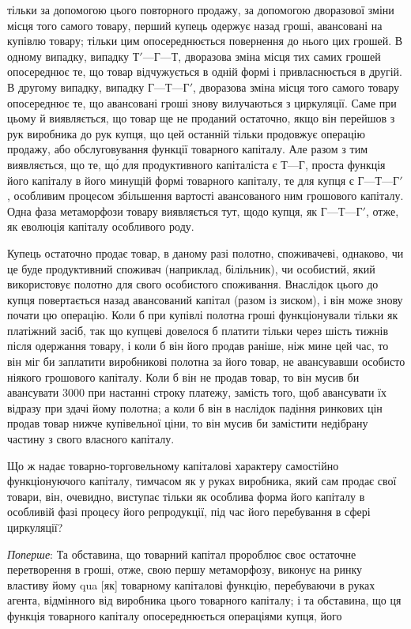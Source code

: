 \parcont{}  %
тільки за допомогою цього повторного продажу, за допомогою
дворазової зміни місця того самого товару, перший купець одержує назад гроші, авансовані на купівлю
товару; тільки цим
опосереднюється повернення до нього цих грошей. В одному
випадку, випадку $Т' — Г — Т$, дворазова зміна місця тих самих грошей опосереднює те, що товар
відчужується в одній
формі і привласнюється в другій. В другому випадку, випадку
$Г — Т — Г'$, дворазова зміна місця того самого товару опосереднює те, що авансовані гроші знову
вилучаються з циркуляції.
Саме при цьому й виявляється, що товар ще не проданий остаточно, якщо він перейшов з рук виробника
до рук купця, що
цей останній тільки продовжує операцію продажу, або обслуговування функції товарного капіталу. Але
разом з тим виявляється, що те, що́ для продуктивного капіталіста є $Т — Г$,
проста функція його капіталу в його минущій формі товарного
капіталу, те для купця є $Г — Т — Г'$, особливим процесом збільшення вартості авансованого ним
грошового капіталу. Одна
фаза метаморфози товару виявляється тут, щодо купця, як
$Г — Т — Г'$, отже, як еволюція капіталу особливого роду.

Купець остаточно продає товар, в даному разі полотно,
споживачеві, однаково, чи це буде продуктивний споживач (наприклад, білільник), чи особистий, який
використовує полотно
для свого особистого споживання. Внаслідок цього до купця
повертається назад авансований капітал (разом із зиском), і він
може знову почати цю операцію. Коли б при купівлі полотна
гроші функціонували тільки як платіжний засіб, так що купцеві довелося б платити тільки через шість
тижнів після одержання товару, і коли б він його продав раніше, ніж мине цей
час, то він міг би заплатити виробникові полотна за його товар,
не авансувавши особисто ніякого грошового капіталу. Коли б він
не продав товар, то він мусив би авансувати 3000 при настанні строку платежу,
замість того, щоб авансувати їх відразу при здачі йому полотна; а коли б він в наслідок падіння
ринкових цін продав товар нижче купівельної ціни,
то він мусив би замістити недібрану частину з свого власного капіталу.

Що ж надає товарно-торговельному капіталові характеру
самостійно функціонуючого капіталу, тимчасом як у руках виробника, який сам продає свої товари, він,
очевидно, виступає
тільки як особлива форма його капіталу в особливій фазі процесу його репродукції, під час його
перебування в сфері циркуляції?

\emph{Поперше}: Та обставина, що товарний капітал пророблює своє
остаточне перетворення в гроші, отже, свою першу метаморфозу, виконує на ринку властиву йому qua
[як] товарному капіталові функцію, перебуваючи в руках агента, відмінного від
виробника цього товарного капіталу; і та обставина, що ця функція товарного капіталу опосереднюється
операціями купця, його
\parbreak{}  %
